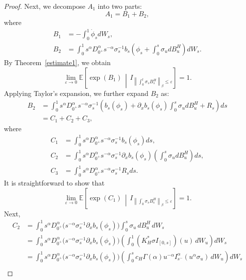 \documentclass[10pt,a4paper]{amsart}
\begin{document}
\begin{proof}
Next, we decompose $A_1$ into two parts:
\begin{equation*}
	A_1 = B_1 + B_2,
\end{equation*}
where
\begin{align*}
	B_1 &= -\int_0^1 \dot{\phi}_s  dW_s, \\
	B_2 &= \int_0^1 s^{\alpha} D_{0^+}^\alpha s^{-\alpha} \sigma_s^{-1} b_s \left( \phi_s + \int_0^s \sigma_u  dB^H_u \right) dW_s.
\end{align*}
By Theorem~\ref{estimate1}, we obtain
\begin{equation*}
	\lim_{\varepsilon \to 0} \mathbb{E} \left[ \exp(B_1) \,\middle|\, I_{\left\| \int_0^t \sigma_s B^H_s \right\|_\beta \leq \varepsilon} \right] = 1.
\end{equation*}
Applying Taylor's expansion, we further expand $B_2$ as:
\begin{align*}
	B_2 &= \int_0^1 s^{\alpha} D_{0^+}^\alpha s^{-\alpha} \sigma_s^{-1} \left( b_s(\phi_s) + \partial_x b_s(\phi_s) \int_0^s \sigma_u  dB^H_u + R_s \right) ds \\
	    &= C_1 + C_2 + C_3,
\end{align*}
where
\begin{align*}
    C_1 &= \int_0^1 s^{\alpha} D_{0^+}^\alpha s^{-\alpha} \sigma_s^{-1} b_s(\phi_s)  ds, \\
    C_2 &= \int_0^1 s^{\alpha} D_{0^+}^\alpha s^{-\alpha} \sigma_s^{-1} \partial_x b_s(\phi_s) \left( \int_0^s \sigma_u  dB^H_u \right) ds,\\
    C_3 &= \int_0^1 s^{\alpha} D_{0^+}^\alpha s^{-\alpha} \sigma_s^{-1} R_s  ds.
\end{align*}
It is straightforward to show that
\begin{equation*}
	\lim_{\varepsilon \to 0} \mathbb{E} \left[ \exp(C_1) \,\middle|\, I_{\left\| \int_0^\cdot \sigma_s B^H_s \right\|_\beta \leq \varepsilon} \right] = 1.
\end{equation*}
Next, 
\begin{align*}
	C_2
	&=\int_0^1 s^{\alpha}D_{0^+}^\alpha \big(s^{-\alpha} \sigma_s^{-1}\partial_x b_s(\phi_s)\big)\int_0^s \sigma_u\, dB^H_u \, dW_s   \\ %
	&=  \int_0^1 s^{\alpha}D_{0^+}^\alpha \big(s^{-\alpha} \sigma_s^{-1}\partial_x b_s(\phi_s)\big)\left(\int_0^1 (K_H^*\sigma I_{[0,s]})(u)\, dW_u\right) dW_s \\ %
	&=\int_0^1 s^{\alpha}D_{0^+}^\alpha \big(s^{-\alpha} \sigma_s^{-1}\partial_x b_s(\phi_s)\big)\left(\int_0^s c_H\Gamma(\alpha)u^{-\alpha}I_{s^-}^\alpha (u^\alpha  \sigma_u)\, dW_u \right)dW_s \\ %

\end{align*}
\end{proof}
\end{document}
